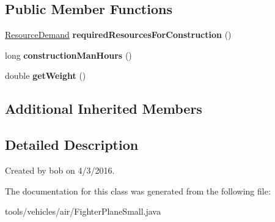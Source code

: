 \subsection*{Public Member Functions}
\begin{DoxyCompactItemize}
\item 
\hyperlink{classuniverse_1_1_resource_demand}{Resource\+Demand} {\bfseries required\+Resources\+For\+Construction} ()\hypertarget{classtools_1_1vehicles_1_1air_1_1_fighter_plane_small_aafd46fd80ee9ba52496a132054d1013a}{}\label{classtools_1_1vehicles_1_1air_1_1_fighter_plane_small_aafd46fd80ee9ba52496a132054d1013a}

\item 
long {\bfseries construction\+Man\+Hours} ()\hypertarget{classtools_1_1vehicles_1_1air_1_1_fighter_plane_small_a653ed5bb1a1e6515e775f2c764f14338}{}\label{classtools_1_1vehicles_1_1air_1_1_fighter_plane_small_a653ed5bb1a1e6515e775f2c764f14338}

\item 
double {\bfseries get\+Weight} ()\hypertarget{classtools_1_1vehicles_1_1air_1_1_fighter_plane_small_a63d00035ca56b125b88a095af96ef2a9}{}\label{classtools_1_1vehicles_1_1air_1_1_fighter_plane_small_a63d00035ca56b125b88a095af96ef2a9}

\end{DoxyCompactItemize}
\subsection*{Additional Inherited Members}


\subsection{Detailed Description}
Created by bob on 4/3/2016. 

The documentation for this class was generated from the following file\+:\begin{DoxyCompactItemize}
\item 
tools/vehicles/air/Fighter\+Plane\+Small.\+java\end{DoxyCompactItemize}
